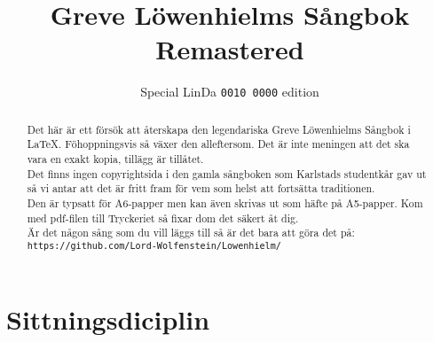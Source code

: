 \documentclass[twoside, openright]{report}
\title{Greve Löwenhielms Sångbok Remastered}
\author{Special LinDa \texttt{0010 0000} edition}
\begin{document}
\maketitle
\thispagestyle{empty}

\cleardoublepage
\begin{abstract}
Det här är ett försök att återskapa den legendariska Greve Löwenhielms Sångbok i \LaTeX. Fö\-hoppningsvis så växer den alleftersom. Det är inte meningen att det ska vara en exakt kopia, tillägg är tillåtet.\\

Det finns ingen copyrightsida i den gamla sångboken som Karlstads studentkår gav ut så vi antar att det är fritt fram för vem som helst att fortsätta traditionen.\\

Den är typsatt för A6-papper men kan även skrivas ut som häfte på A5-papper. Kom med pdf-filen till Tryckeriet så fixar dom det säkert åt dig.\\

Är det någon sång som du vill läggs till så är det bara att göra det på:\\
\texttt{\small https://github.com/Lord-Wolfenstein/Lowenhielm/}
\end{abstract}
\thispagestyle{empty}
\tableofcontents

\chapter*{Sittningsdiciplin}
\end{document}
